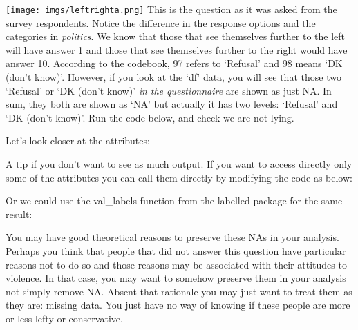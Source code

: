 \documentclass[
]{book}
\newenvironment{Shaded}{\begin{snugshade}}{\end{snugshade}}
\newcommand{\CommentTok}[1]{\textcolor[rgb]{0.56,0.35,0.01}{\textit{#1}}}
\newcommand{\FunctionTok}[1]{\textcolor[rgb]{0.13,0.29,0.53}{\textbf{#1}}}
\newcommand{\NormalTok}[1]{#1}
\newcommand{\SpecialCharTok}[1]{\textcolor[rgb]{0.81,0.36,0.00}{\textbf{#1}}}
\begin{document}
\texttt{[image: imgs/leftrighta.png]}
This is the question as it was asked from the survey respondents. Notice the difference in the response options and the categories in \emph{politics}. We know that those that see themselves further to the left will have answer 1 and those that see themselves further to the right would have answer 10. According to the codebook, 97 refers to `Refusal' and 98 means `DK (don't know)'. However, if you look at the `df' data, you will see that those two `Refusal' or `DK (don't know)' \emph{in the questionnaire} are shown as just NA. In sum, they both are shown as `NA' but actually it has two levels: `Refusal' and `DK (don't know)'. Run the code below, and check we are not lying.

Let's look closer at the attributes:

\begin{Shaded}
\end{Shaded}

A tip if you don't want to see as much output. If you want to access directly only some of the attributes you can call them directly by modifying the code as below:

\begin{Shaded}
\end{Shaded}

Or we could use the val\_labels function from the labelled package for the same result:

\begin{Shaded}
\end{Shaded}

You may have good theoretical reasons to preserve these NAs in your analysis. Perhaps you think that people that did not answer this question have particular reasons not to do so and those reasons may be associated with their attitudes to violence. In that case, you may want to somehow preserve them in your analysis not simply remove NA. Absent that rationale you may just want to treat them as they are: missing data. You just have no way of knowing if these people are more or less lefty or conservative.
\end{document}
